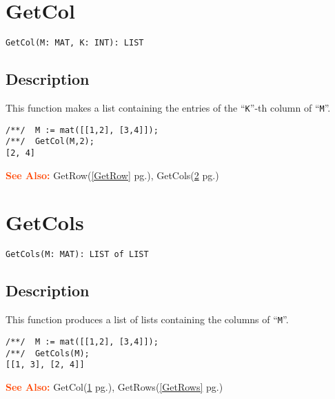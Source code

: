 \documentclass[a4paper]{mybook}
\newenvironment{command}{}{} %
\newcommand\SeeAlso{\par\textcolor{OrangeRed}{\textbf{\large See Also: }}}
\begin{document}
\section{GetCol}
\label{GetCol}
\begin{command} %


\begin{Verbatim}[label=syntax, rulecolor=\color{MidnightBlue},
frame=single]
GetCol(M: MAT, K: INT): LIST
\end{Verbatim}


\subsection*{Description}

This function makes a list containing the entries of the ``\verb&K&''-th column of ``\verb&M&''.
\begin{Verbatim}[label=example, rulecolor=\color{PineGreen}, frame=single]
/**/  M := mat([[1,2], [3,4]]);
/**/  GetCol(M,2);
[2, 4]
\end{Verbatim}


\SeeAlso %
  GetRow(\ref{GetRow} pg.\pageref{GetRow}), 
    GetCols(\ref{GetCols} pg.\pageref{GetCols})
\end{command} %

\section{GetCols}
\label{GetCols}
\begin{command} %


\begin{Verbatim}[label=syntax, rulecolor=\color{MidnightBlue},
frame=single]
GetCols(M: MAT): LIST of LIST
\end{Verbatim}


\subsection*{Description}

This function produces a list of lists containing the columns of ``\verb&M&''.
\begin{Verbatim}[label=example, rulecolor=\color{PineGreen}, frame=single]
/**/  M := mat([[1,2], [3,4]]);
/**/  GetCols(M);
[[1, 3], [2, 4]]
\end{Verbatim}


\SeeAlso %
  GetCol(\ref{GetCol} pg.\pageref{GetCol}), 
    GetRows(\ref{GetRows} pg.\pageref{GetRows})
\end{command} %
\end{document}
